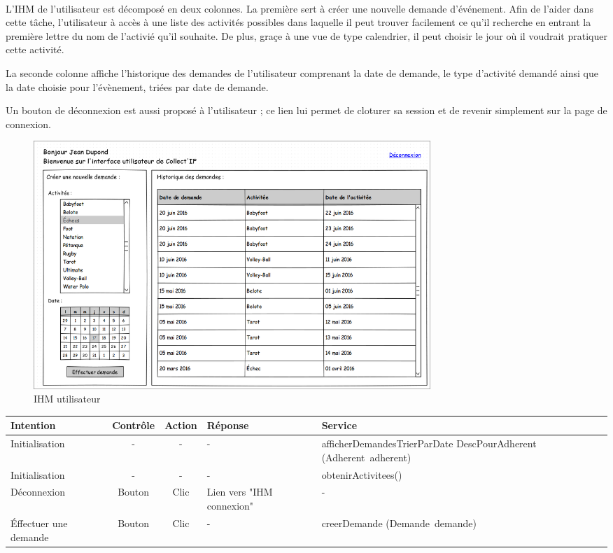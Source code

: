 \documentclass[a4paper,11pt]{article}
\begin{document}
\paragraph{}
L'IHM de l'utilisateur est décomposé en deux colonnes. La première sert à créer une nouvelle demande d'événement. Afin de l'aider dans cette tâche, l'utilisateur à accès à une liste des activités possibles dans laquelle il peut trouver facilement ce qu'il recherche en entrant la première lettre du nom de l'activié qu'il souhaite. De plus, graçe à une vue de type calendrier, il peut choisir le jour où il voudrait pratiquer cette activité.

La seconde colonne affiche l'historique des demandes de l'utilisateur comprenant la date de demande, le type d'activité demandé ainsi que la date choisie pour l'évènement, triées par date de demande.

Un bouton de déconnexion est aussi proposé à l'utilisateur ; ce lien lui permet de cloturer sa session et de revenir simplement sur la page de connexion.

\begin{figure}[H]
  \begin{center}
    \includegraphics[width=15cm]{../../IHM/IHM_utilisateur.png}
    \caption{IHM utilisateur}
  \end{center}
\end{figure}

\begin{table}[H]
  \begin{center}
    \begin{tabular}{|M{2.5cm}|c|c|M{3cm}|m{5cm}|}
       \hline
       \textbf{Intention} & \textbf{Contrôle} & \textbf{Action} & \textbf{Réponse} & \textbf{Service} \\ 
       \hline
       Initialisation & - & - & - & afficherDemandesTrierParDate DescPourAdherent (Adherent~adherent) \\ 
       \hline
       Initialisation & - & - & - & obtenirActivitees() \\ 
       \hline
       Déconnexion & Bouton & Clic & Lien vers "IHM connexion" & - \\ 
       \hline
       Éffectuer une demande & Bouton & Clic & - & creerDemande (Demande~demande) \\ 
       \hline
    \end{tabular}
  \end{center}
\end{table}
\end{document}
